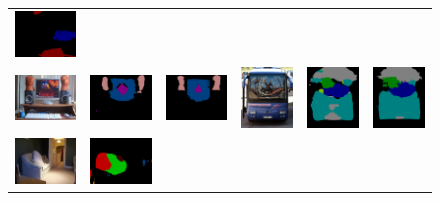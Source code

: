 \begin{figure}[!htbp]
{\begin{tabular}{c c c | c c c}
    \includegraphics[height=0.12\linewidth]{fig/res_crf/2007_000529.png} \\
    \includegraphics[height=0.12\linewidth]{fig/img/2007_000559.jpg} &
    \includegraphics[height=0.12\linewidth]{fig/res_none/2007_000559.png} &
    \includegraphics[height=0.12\linewidth]{fig/res_crf/2007_000559.png} &
    \includegraphics[height=0.12\linewidth]{fig/img/2007_000663.jpg} &
    \includegraphics[height=0.12\linewidth]{fig/res_none/2007_000663.png} &
    \includegraphics[height=0.12\linewidth]{fig/res_crf/2007_000663.png} \\    
    \includegraphics[height=0.12\linewidth]{fig/img/2007_000452.jpg} &
    \includegraphics[height=0.12\linewidth]{fig/res_none/2007_000452.png} &

\end{tabular}}
\end{figure}
